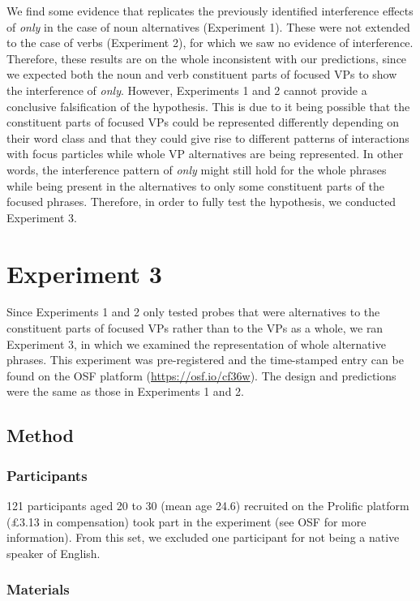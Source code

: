 \documentclass[output=paper,colorlinks,citecolor=brown]{langscibook}
\begin{document}
We find some evidence that replicates the previously identified interference effects of \textit{only} in the case of noun alternatives (Experiment 1). These were not extended to the case of verbs (Experiment 2), for which we saw no evidence of interference. Therefore, these results are on the whole inconsistent with our predictions, since we expected both the noun and verb constituent parts of focused VPs to show the interference of \textit{only}. However, Experiments 1 and 2 cannot provide a conclusive falsification of the hypothesis. This is due to it being possible that the constituent parts of focused VPs could be represented differently depending on their word class and that they could give rise to different patterns of interactions with focus particles while whole VP alternatives are being represented. In other words, the interference pattern of \textit{only} might still hold for the whole phrases while being present in the alternatives to only some constituent parts of the focused phrases. Therefore, in order to fully test the hypothesis, we conducted Experiment 3.

\section{Experiment 3}

Since Experiments 1 and 2 only tested probes that were alternatives to the constituent parts of focused VPs rather than to the VPs as a whole, we ran Experiment 3, in which we examined the representation of whole alternative phrases. This experiment was pre-registered and the time-stamped entry can be found on the OSF platform (\url{https://osf.io/cf36w}). The design and predictions were the same as those in Experiments 1 and 2.

\subsection{Method}

\subsubsection{Participants}

121 participants aged 20 to 30 (mean age 24.6) recruited on the Prolific platform (£3.13 in compensation) took part in the experiment (see OSF for more information). From this set, we excluded one participant for not being a native speaker of English.

\subsubsection{Materials}
\end{document}
